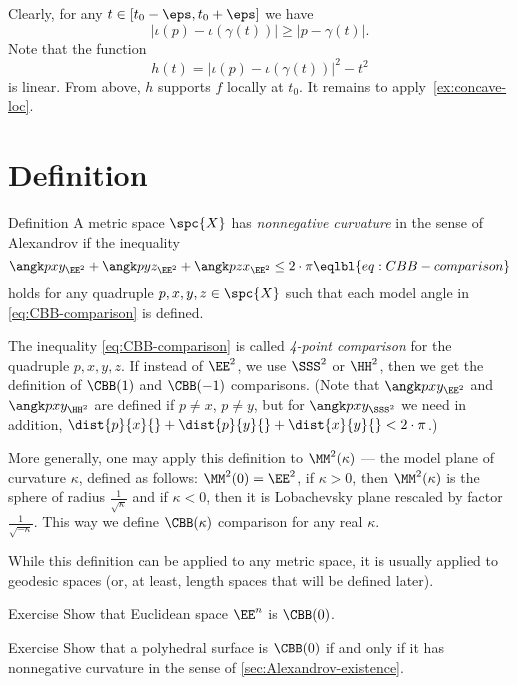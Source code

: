 Clearly, for any $t\in[t_0-\eps,t_0+\eps]$ 
we have 
$$|\iota(p)-\iota(\gamma(t))|\ge|p-\gamma(t)|.$$
Note that
the function
$$h(t)= |\iota(p)-\iota(\gamma(t))|^2-t^2$$
is linear.
From above, $h$ supports $f$ locally  at $t_0$.
It remains to apply~\ref{ex:concave-loc}.
\qeds

\section{Definition}

\begin{thm}{Definition}\label{def:CBB}
A metric space $\spc{X}$ has {}\emph{nonnegative curvature} in the sense of Alexandrov if the inequality 
\[\angk  pxy_{\EE^2}+\angk pyz_{\EE^2}+\angk pzx_{\EE^2}
\le 
2\cdot\pi
\eqlbl{eq:CBB-comparison}\]
holds for any quadruple $p,x,y,z\in\spc{X}$ such that each model angle in \ref{eq:CBB-comparison} is defined. 

The inequality \ref{eq:CBB-comparison} is called \emph{4-point comparison} for the quadruple $p,x,y,z$.
If instead of $\EE^2$, we use $\SSS^2$ or $\HH^2$, then we get the definition of
$\CBB(1)$ and $\CBB(-1)$ comparisons.
(Note that $\angk  pxy_{\EE^2}$ and $\angk  pxy_{\HH^2}$ are defined if $p\ne x$, $p\ne y$,
but for $\angk  pxy_{\SSS^2}$ we need in addition, $\dist{p}{x}{}+\dist{p}{y}{}+\dist{x}{y}{}<2\cdot\pi$.)

More generally, one may apply this definition to $\MM^2(\kappa)$ --- the model plane of curvature $\kappa$, defined as follows:
$\MM^2(0)=\EE^2$,
if $\kappa>0$, then $\MM^2(\kappa)$ is the sphere of radius $\tfrac{1}{\sqrt{\kappa}}$ and if $\kappa<0$, then it is Lobachevsky plane rescaled by factor $\tfrac{1}{\sqrt{-\kappa}}$.
This way we define $\CBB(\kappa)$ comparison for any real $\kappa$.
\end{thm}

While this definition can be applied to any metric space,
it is usually applied to geodesic spaces (or, at least, length spaces that will be defined later).

\begin{thm}{Exercise}
Show that Euclidean space $\EE^n$ is $\CBB(0)$.
\end{thm}


\begin{thm}{Exercise}\label{ex:polyCBB}
Show that a polyhedral surface is $\CBB(0)$ if and only if it has nonnegative curvature in the sense of \ref{sec:Alexandrov-existence}. 
\end{thm}





